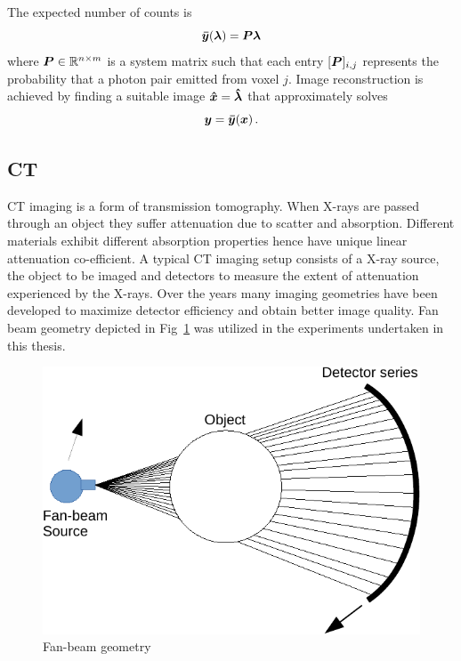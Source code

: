 The expected number of counts is
\begin{equation}\label{eq:PET}
\bm{\bar{y}}(\bm{\lambda}) = \bm{P} \bm{\lambda}
\end{equation}
where $\bm{P} \in \mathbb{R}^{n\times m}$ is a system matrix such that each entry $[\bm{P}]_{i,j}$ represents the probability that a photon pair emitted from voxel $j$. Image reconstruction is achieved by finding a suitable image $\bm{\hat{x}} = \bm{\hat{\lambda}}$ that approximately solves 
\begin{equation}\label{eq:pb1solve}
\bm{y} = \bm{\bar{y}}(\bm{x}) \, .
\end{equation} 

\subsection{CT}

\ac{CT} imaging is a form of transmission tomography. When X-rays are passed through an object they suffer attenuation due to scatter and absorption. Different materials exhibit different absorption properties hence have unique linear attenuation co-efficient. A typical \ac{CT} imaging setup consists of a X-ray source, the object to be imaged and detectors to measure the extent of attenuation experienced by the X-rays. Over the years many imaging geometries have been developed to maximize detector efficiency and obtain better image quality. Fan beam geometry depicted in Fig~\ref{fig:xgeo} was utilized in the experiments undertaken in this thesis. 

\begin{figure}[!htbp]
	\centering
	\includegraphics[width=0.7\linewidth]{./Figures/x_ray_geo-crop.pdf}
	\caption{Fan-beam geometry }
	\label{fig:xgeo}
\end{figure}


